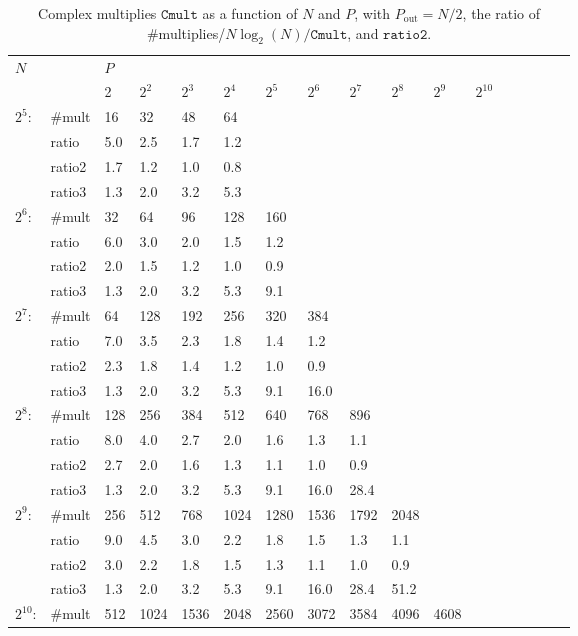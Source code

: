 \documentclass[10pt]{article}
\begin{document}
\begin{table*}
  \caption{Complex multiplies $\mathtt{Cmult}$ as a function of $N$
    and $P$, with $P_{\text{out}} = N/2$, the ratio of
    \#multiplies/$N\log_2(N)/\mathtt{Cmult}$, and
    $\mathtt{ratio2}$.}
  \label{tab:counts}
\centering
{\tiny
\begin{tabular}{lllllllllllllllll}
\hline
$N$ & & $P$ \\
&        &  2    &  $2^2$  &  $2^3$ & $2^4$ & $2^5$ & $2^6$ & $2^7$ & $2^8$ & $2^9$ & $2^{10}$ \\
  \hline
$2^{5}$: & \#mult &  16&  32&  48&  64\\
          & ratio & 5.0& 2.5& 1.7& 1.2\\
          & ratio2 & 1.7& 1.2& 1.0& 0.8\\
          & ratio3 & 1.3& 2.0& 3.2& 5.3\\[.3em]
$2^{6}$: & \#mult &  32&  64&  96&  128&  160\\
          & ratio & 6.0& 3.0& 2.0& 1.5& 1.2\\
          & ratio2 & 2.0& 1.5& 1.2& 1.0& 0.9\\
          & ratio3 & 1.3& 2.0& 3.2& 5.3& 9.1\\[.3em]
$2^{7}$: & \#mult &  64&  128&  192&  256&  320&  384\\
          & ratio & 7.0& 3.5& 2.3& 1.8& 1.4& 1.2\\
          & ratio2 & 2.3& 1.8& 1.4& 1.2& 1.0& 0.9\\
          & ratio3 & 1.3& 2.0& 3.2& 5.3& 9.1& 16.0\\[.3em]
$2^{8}$: & \#mult &  128&  256&  384&  512&  640&  768&  896\\
          & ratio & 8.0& 4.0& 2.7& 2.0& 1.6& 1.3& 1.1\\
          & ratio2 & 2.7& 2.0& 1.6& 1.3& 1.1& 1.0& 0.9\\
          & ratio3 & 1.3& 2.0& 3.2& 5.3& 9.1& 16.0& 28.4\\[.3em]
$2^{9}$: & \#mult &  256&  512&  768&  1024&  1280&  1536&  1792&  2048\\
          & ratio & 9.0& 4.5& 3.0& 2.2& 1.8& 1.5& 1.3& 1.1\\
          & ratio2 & 3.0& 2.2& 1.8& 1.5& 1.3& 1.1& 1.0& 0.9\\
          & ratio3 & 1.3& 2.0& 3.2& 5.3& 9.1& 16.0& 28.4& 51.2\\[.3em]
$2^{10}$: & \#mult &  512&  1024&  1536&  2048&  2560&  3072&  3584&  4096&  4608\\

\end{tabular}}
\end{table*}
\end{document}
